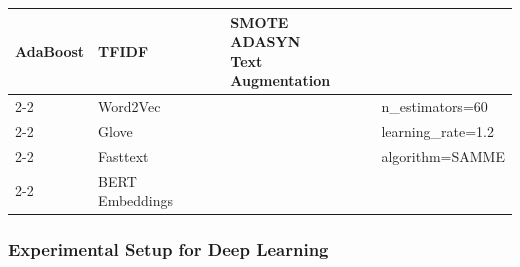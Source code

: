 \begin{center}
\begin{longtable}{|l|l|l|l|}
\multirow{5}{*}{AdaBoost} & TFIDF & \multirow{5}{*}{\parbox{3cm}{SMOTE\\ADASYN\\Text Augmentation}} & \\ \cline{2-2}
& Word2Vec & & n\_estimators=60 \\ \cline{2-2}
& Glove & & learning\_rate=1.2 \\ \cline{2-2}
& Fasttext & & algorithm=SAMME \\ \cline{2-2}
& BERT Embeddings & &  \\ \hline

\end{longtable}
\end{center}

\newpage
\subsubsection{Experimental Setup for Deep Learning}


